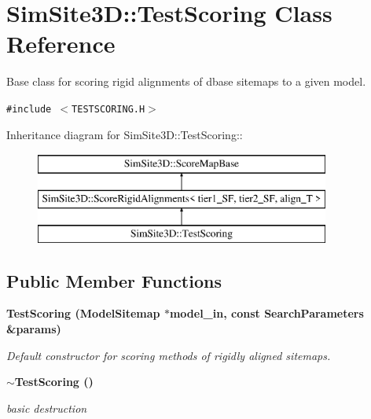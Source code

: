 \section{SimSite3D::Test\-Scoring Class Reference}
\label{classSimSite3D_1_1TestScoring}
Base class for scoring rigid alignments of dbase sitemaps to a given model.  


{\tt \#include $<$TESTSCORING.H$>$}

Inheritance diagram for SimSite3D::Test\-Scoring::\begin{figure}[H]
\begin{center}
\leavevmode
\includegraphics[height=3cm]{classSimSite3D_1_1TestScoring}
\end{center}
\end{figure}
\subsection*{Public Member Functions}
\begin{CompactItemize}
\item 
\bf{Test\-Scoring} (\bf{Model\-Sitemap} $\ast$model\_\-in, const \bf{Search\-Parameters} \&params)
\begin{CompactList}\small\item\em Default constructor for scoring methods of rigidly aligned sitemaps. \item\end{CompactList}\item 
\bf{$\sim$Test\-Scoring} ()\label{classSimSite3D_1_1TestScoring_47bf11af16fb49567855096808ec8a7f}

\begin{CompactList}\small\item\em basic destruction \item\end{CompactList}\end{CompactItemize}
